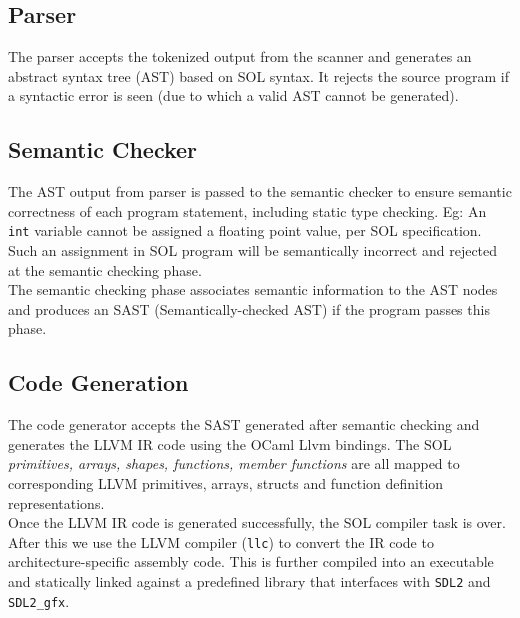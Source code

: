 \documentclass[letterpaper,12pt]{report}
\begin{document}
{    \subsection{Parser}
      The parser accepts the tokenized output from the scanner and generates an abstract syntax tree (AST) based on SOL syntax. It rejects the source program if a syntactic error is seen (due to which a valid AST cannot be generated).

    \subsection{Semantic Checker}
      The AST output from parser is passed to the semantic checker to ensure semantic correctness of each program statement, including static type checking. Eg: An \texttt{int} variable cannot be assigned a floating point value, per SOL specification. Such an assignment in SOL program will be semantically incorrect and rejected at the semantic checking phase.\\
      The semantic checking phase associates semantic information to the AST nodes and produces an SAST (Semantically-checked AST) if the program passes this phase.

    \subsection{Code Generation}
    The code generator accepts the SAST generated after semantic checking and generates the LLVM IR code using the OCaml Llvm bindings. The SOL \textit{primitives, arrays, shapes, functions, member functions} are all mapped to corresponding LLVM primitives, arrays, structs and function definition representations.\\
    Once the LLVM IR code is generated successfully, the SOL compiler task is over. After this we use the LLVM compiler (\texttt{llc}) to convert the IR code to architecture-specific assembly code. This is further compiled into an executable and statically linked against a predefined library that interfaces with \texttt{SDL2} and \texttt{SDL2\_gfx}. 

}
\end{document}
